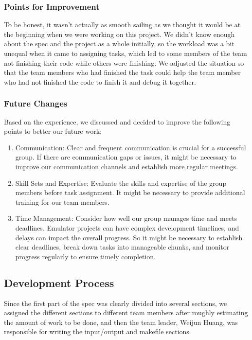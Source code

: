 \documentclass[11pt]{article}
\begin{document}
\subsubsection*{Points for Improvement}

To be honest, it wasn't actually as smooth sailing as we thought it would be at the beginning when we were working on this project. We didn't know enough about the spec and the project as a whole initially, so the workload was a bit unequal when it came to assigning tasks, which led to some members of the team not finishing their code while others were finishing. We adjusted the situation so that the team members who had finished the task could help the team member who had not finished the code to finish it and debug it together.

\subsubsection*{Future Changes}

Based on the experience, we discussed and decided to improve the following points to better our future work:

\begin{enumerate}
  \item Communication: Clear and frequent communication is crucial for a successful group. If there are communication gaps or issues, it might be necessary to improve our communication channels and establish more regular meetings.
  \item Skill Sets and Expertise: Evaluate the skills and expertise of the group members before task assignment. It might be necessary to provide additional training for our team members.
  \item Time Management: Consider how well our group manages time and meets deadlines. Emulator projects can have complex development timelines, and delays can impact the overall progress. So it might be necessary to establish clear deadlines, break down tasks into manageable chunks, and monitor progress regularly to ensure timely completion.
\end{enumerate}

\subsection*{Development Process}

Since the first part of the spec was clearly divided into several sections, we assigned the different sections to different team members after roughly estimating the amount of work to be done, and then the team leader, Weijun Huang, was responsible for writing the input/output and makefile sections.
\end{document}
